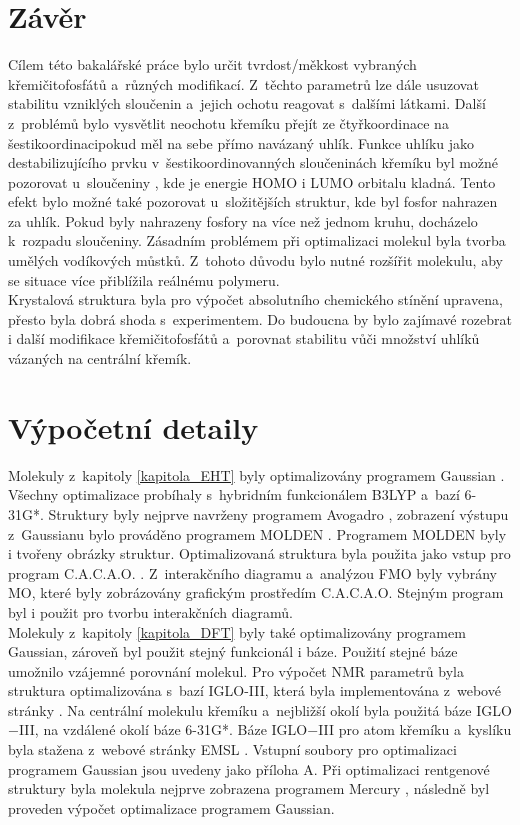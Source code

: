 \documentclass[
  printed, %
  table,   %
  lof,     %
  lot,     %
  oneside,
]{fithesis3}
\begin{document}
  \chapter{Závěr}
Cílem této bakalářské práce bylo určit tvrdost/měkkost vybraných křemičitofosfátů a~různých modifikací. Z~těchto parametrů lze dále usuzovat stabilitu vzniklých sloučenin a~jejich ochotu reagovat s~dalšími látkami. Další z~problémů bylo vysvětlit neochotu křemíku přejít ze čtyřkoordinace na šestikoordinacipokud měl na sebe přímo navázaný uhlík. Funkce uhlíku jako destabilizujícího prvku v~šestikoordinovanných sloučeninách křemíku byl možné pozorovat u~sloučeniny , kde je energie HOMO i LUMO orbitalu kladná. Tento efekt bylo možné také pozorovat u~složitějších struktur, kde byl fosfor nahrazen za uhlík. Pokud byly nahrazeny fosfory na více než jednom kruhu, docházelo k~rozpadu sloučeniny. Zásadním problémem při optimalizaci molekul byla tvorba umělých vodíkových můstků. Z~tohoto důvodu bylo nutné rozšířit molekulu, aby se situace více přiblížila reálnému polymeru. \\
Krystalová struktura byla pro výpočet absolutního chemického stínění upravena, přesto byla dobrá shoda s~experimentem. Do budoucna by bylo zajímavé rozebrat i další modifikace křemičitofosfátů a~porovnat stabilitu vůči množství uhlíků vázaných na centrální křemík. 
  
  \chapter{Výpočetní detaily}
  Molekuly z~kapitoly \ref{kapitola_EHT} byly optimalizovány programem Gaussian \cite{g09}. Všechny optimalizace probíhaly s~hybridním funkcionálem B3LYP a~bazí 6-31G*. Struktury byly nejprve navrženy programem Avogadro \cite{Avogadro}, zobrazení výstupu z~Gaussianu bylo prováděno programem MOLDEN \cite{Molden}. Programem MOLDEN byly i tvořeny obrázky struktur. Optimalizovaná struktura byla použita jako vstup pro program C.A.C.A.O. \cite{cacao}. Z~interakčního diagramu a~analýzou FMO byly vybrány MO, které byly zobrázovány grafickým prostředím C.A.C.A.O. Stejným program byl i použit pro tvorbu interakčních diagramů. \\
  Molekuly z~kapitoly \ref{kapitola_DFT} byly také optimalizovány programem Gaussian, zároveň byl použit stejný funkcionál i báze. Použití stejné báze umožnilo vzájemné porovnání molekul. Pro výpočet NMR parametrů byla struktura optimalizována s~bazí IGLO-III, která byla implementována z~webové stránky  . Na centrální molekulu křemíku a~nejbližší okolí byla použitá báze IGLO$-$III, na vzdálené okolí báze 6-31G*. Báze IGLO$-$III pro atom křemíku a~kyslíku byla stažena z~webové stránky EMSL \cite{EMSL}. Vstupní soubory pro optimalizaci programem Gaussian jsou uvedeny jako příloha A. Při optimalizaci rentgenové struktury byla molekula nejprve zobrazena programem Mercury \cite{Mercury}, následně byl proveden výpočet optimalizace programem Gaussian.
  
\end{document}
